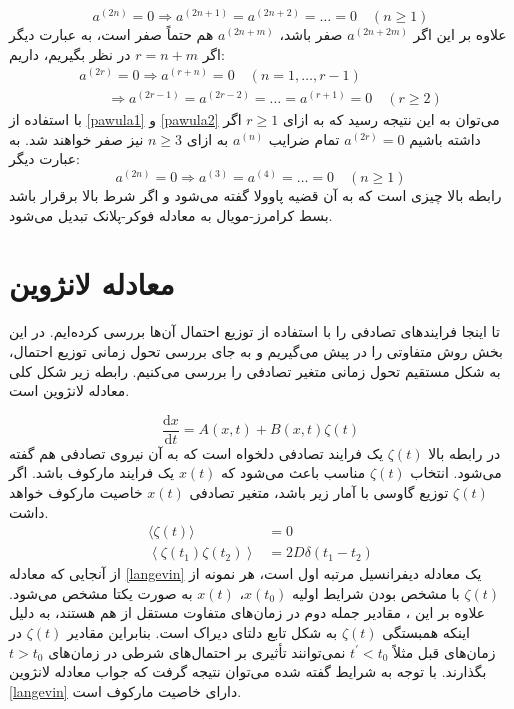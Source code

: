 \begin{equation}
  a^{(2 n)}=0 \Rightarrow a^{(2 n+1)}=a^{(2 n+2)}=\ldots=0 \quad(n \geq 1)
  \label{pawula1}
\end{equation}
علاوه بر این اگر $a^{(2 n + 2 m)}$ صفر باشد، $a^{(2 n + m)}$ هم حتماً صفر است، به عبارت دیگر اگر $r = n + m$ در نظر بگیریم، داریم:
\begin{equation}
\begin{array}{l}{a^{(2 r)}=0 \Rightarrow a^{(r+n)}=0 \quad(n=1, \ldots, r-1)} \\ \qquad \Rightarrow {a^{(2 r-1)}=a^{(2 r-2)}=\ldots=a^{(r+1)}=0 \quad(r \geq 2)}\end{array}
  \label{pawula2}
\end{equation}
با استفاده از \ref{pawula1} و \ref{pawula2} می‌توان به این نتیجه رسید که به ازای $r \geq 1$ اگر داشته باشیم $a^{(2 r)}=0$ تمام ضرایب $a^{(n)}$ به ازای $n \geq 3$ نیز صفر خواهند شد. به عبارت دیگر:
\begin{equation}
  a^{(2 n)}=0 \Rightarrow a^{(3)}=a^{(4)}=\ldots=0 \quad(n \geq 1)
  \label{pwula}
\end{equation}
رابطه بالا چیزی است که به آن قضیه پاوولا گفته می‌شود و اگر شرط بالا برقرار باشد بسط کرامرز-مویال به معادله فوکر-پلانک تبدیل می‌شود.\cite{pawula_generalizations_1967}

\section{معادله لانژوین}

تا اینجا فرایندهای تصادفی را با استفاده از توزیع احتمال آن‌ها بررسی کرده‌ایم. در این بخش روش متفاوتی را در پیش می‌گیریم و به جای بررسی تحول زمانی توزیع احتمال، به شکل مستقیم تحول زمانی متغیر تصادفی را بررسی می‌کنیم. رابطه زیر شکل کلی معادله لانژوین است.\cite{lemons_paul_1997}

\begin{equation}
\frac{\mathrm{d} x}{\mathrm{d} t}=A(x, t)+B(x, t) \zeta(t)
\label{langevin}
\end{equation}
در رابطه بالا $\zeta (t)$ یک فرایند تصادفی دلخواه است که به آن نیروی تصادفی هم گفته می‌شود. انتخاب $\zeta (t)$ مناسب باعث می‌شود که $x(t)$ یک فرایند مارکوف باشد. اگر $\zeta (t)$ توزیع گاوسی با آمار زیر باشد، متغیر تصادفی $x(t)$ خاصیت مارکوف خواهد داشت.
\begin{equation}
\begin{aligned}\langle\zeta(t)\rangle &= 0 \\\left\langle\zeta\left(t_{1}\right) \zeta\left(t_{2}\right)\right\rangle &= 2 D \delta\left(t_{1}-t_{2}\right) \end{aligned}
  \label{noise_term_properties}
\end{equation}
از آنجایی که معادله \ref{langevin} یک معادله دیفرانسیل مرتبه اول است، هر نمونه از $\zeta(t)$ با مشخص بودن شرایط اولیه $x(t_{0})$، $x(t)$ به صورت یکتا مشخص می‌شود. علاوه بر این ، مقادیر جمله دوم در زمان‌های متفاوت مستقل از هم هستند، به دلیل اینکه همبستگی $\zeta(t)$ به شکل تابع دلتای دیراک است. بنابراین مقادیر $\zeta(t)$ در زمان‌های قبل مثلاً $t^\prime < t_{0}$ نمی‌توانند تأثیری بر احتمال‌های شرطی در زمان‌‌های $t > t_{0}$ بگذارند. با توجه به شرایط گفته شده می‌توان نتیجه گرفت که جواب معادله لانژوین \ref{langevin} دارای خاصیت مارکوف است. 

